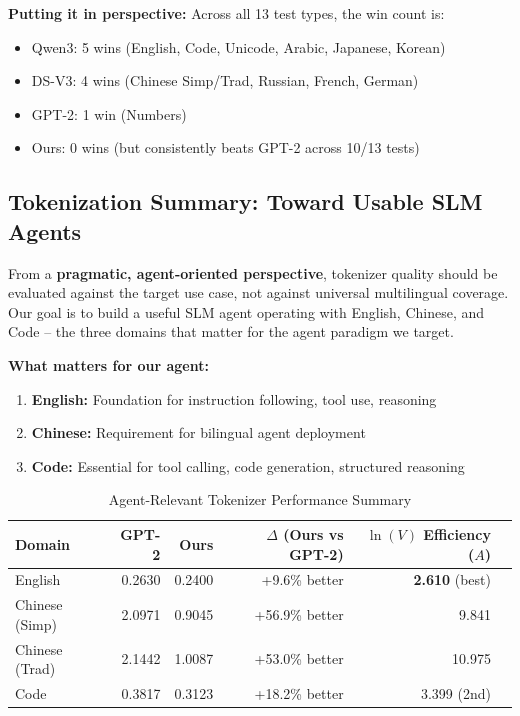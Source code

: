 \textbf{Putting it in perspective:} Across all 13 test types, the win count is:
\begin{itemize}
    \item Qwen3: 5 wins (English, Code, Unicode, Arabic, Japanese, Korean)
    \item DS-V3: 4 wins (Chinese Simp/Trad, Russian, French, German)
    \item GPT-2: 1 win (Numbers)
    \item Ours: 0 wins (but consistently beats GPT-2 across 10/13 tests)
\end{itemize}

\subsection{Tokenization Summary: Toward Usable SLM Agents}

From a \textbf{pragmatic, agent-oriented perspective}, tokenizer quality should be evaluated against the target use case, not against universal multilingual coverage. Our goal is to build a useful SLM agent operating with English, Chinese, and Code -- the three domains that matter for the agent paradigm we target.

\textbf{What matters for our agent:}
\begin{enumerate}
    \item \textbf{English:} Foundation for instruction following, tool use, reasoning
    \item \textbf{Chinese:} Requirement for bilingual agent deployment
    \item \textbf{Code:} Essential for tool calling, code generation, structured reasoning
\end{enumerate}

\begin{table}[h]
    \centering
    \caption{Agent-Relevant Tokenizer Performance Summary}
    \begin{tabular}{lrrrrr}
        \toprule
        \textbf{Domain} & \textbf{GPT-2} & \textbf{Ours} & \textbf{$\Delta$ (Ours vs GPT-2)} & \textbf{$\ln(V)$ Efficiency ($A$)} \\
        \midrule
        English & 0.2630 & 0.2400 & +9.6\% better & \textbf{2.610} (best) \\
        Chinese (Simp) & 2.0971 & 0.9045 & +56.9\% better & 9.841 \\
        Chinese (Trad) & 2.1442 & 1.0087 & +53.0\% better & 10.975 \\
        Code & 0.3817 & 0.3123 & +18.2\% better & 3.399 (2nd) \\
        \bottomrule
    \end{tabular}
\end{table}

